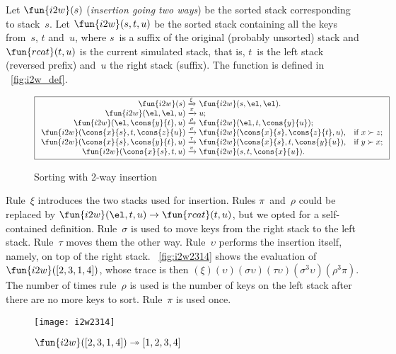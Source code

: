 Let \(\fun{i2w}(s)\) (\emph{insertion going two
  ways}) be the sorted stack corresponding to stack~\(s\). Let
\(\fun{i2w}(s,t,u)\) be the sorted stack
containing all the keys from~\(s\), \(t\) and~\(u\), where \(s\)~is a
suffix of the original (probably unsorted) stack and
\(\fun{rcat}(t,u)\) is the current simulated
stack, that is, \(t\)~is the left stack (reversed prefix) and~\(u\)
the right stack (suffix). The function
 is defined in
\fig~\vref{fig:i2w_def}.
\begin{figure}
\begin{equation*}
\boxed{%
\begin{array}{r@{\;}l@{\;}ll}
\fun{i2w}(s)         & \xrightarrow{\smash{\xi}}
                     & \fun{i2w}(s,\el,\el).\\
\fun{i2w}(\el,\el,u) & \xrightarrow{\smash{\pi}}
                     & u;\\
\fun{i2w}(\el,\cons{y}{t},u)
                     & \xrightarrow{\smash{\rho}}
                     & \fun{i2w}(\el,t,\cons{y}{u});\\
\fun{i2w}(\cons{x}{s},t,\cons{z}{u})
                     & \xrightarrow{\smash{\sigma}}
                     & \fun{i2w}(\cons{x}{s},\cons{z}{t},u),
                     & \text{if \(x \succ z\)};\\
\fun{i2w}(\cons{x}{s},\cons{y}{t},u)
                     & \xrightarrow{\smash{\tau}}
                     & \fun{i2w}(\cons{x}{s},t,\cons{y}{u}),
                     & \text{if \(y \succ x\)};\\
\fun{i2w}(\cons{x}{s},t,u)
                     & \xrightarrow{\smash{\upsilon}}
                     & \fun{i2w}(s,t,\cons{x}{u}).
\end{array}}
\end{equation*}
\caption{Sorting with 2-way insertion }
\label{fig:i2w_def}
\end{figure}
Rule~\(\xi\) introduces the two stacks used for insertion. Rules
\(\pi\)~and~\(\rho\) could be replaced by \(\fun{i2w}(\el,t,u)
\rightarrow \fun{rcat}(t,u)\), but we opted for a self\hyp{}contained
definition. Rule~\(\sigma\) is used to move keys from the right stack
to the left stack. Rule~\(\tau\) moves them the other
way. Rule~\(\upsilon\) performs the insertion itself, namely, on top
of the right stack. \Fig~\vref{fig:i2w2314} shows the evaluation of
\(\fun{i2w}([2,3,1,4])\), whose trace  is then \((\xi)(\upsilon)(\sigma\upsilon)
(\tau\upsilon)(\sigma^3\upsilon)(\rho^3\pi)\). The number of times
rule~\(\rho\) is used is the number of keys on the left
stack after there are no more keys to sort. Rule~\(\pi\) is used once.
\begin{figure}[h]
\centering
\texttt{[image: i2w2314]}
\caption{\(\fun{i2w}([2,3,1,4]) \twoheadrightarrow [1,2,3,4]\)}
\label{fig:i2w2314}
\end{figure}

